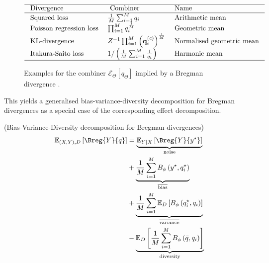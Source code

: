 \documentclass[../main.tex]{subfiles}
\begin{document}
\begin{figure}
$$
\begin{array}{lll}
\hline \text { Divergence } & \text { Combiner } & \text { Name } \\
\hline \text { Squared loss } & \frac{1}{M} \sum_{i=1}^M q_i & \text { Arithmetic mean } \\
\text { Poisson regression loss } & \prod_{i=1}^M q_i^{\frac{1}{M}} & \text { Geometric mean } \\
\text { KL-divergence } & Z^{-1} \prod_{i=1}^M\left(\mathbf{q}_i^{(c)}\right)^{\frac{1}{M}} & \text { Normalised geometric mean } \\
\text { Itakura-Saito loss } & 1 /\left(\frac{1}{M} \sum_{i=1}^M \frac{1}{q_i}\right) & \text { Harmonic mean } \\
\hline
\end{array}
$$
\caption{Examples for the combiner $\mathcal{E}_\Theta \left[q_\Theta\right]$ implied by a Bregman divergence \cite{wood_UnifiedTheoryDiversity_2023}.}
\end{figure}

This yields a generalised bias-variance-diversity decomposition for Bregman divergences as a special case of the corresponding effect decomposition.


\begin{theorem} (Bias-Variance-Diversity decomposition for Bregman divergences)
    \label{thm:bregman-diversity-decomp}
\begin{align*}
\mathbb{E}_{(X,Y), D}\left[ \Breg{Y}{q} \right]  
&= \underbrace{\mathbb{E}_{Y|X}\left[ \Breg{Y}{y^\star} \right]   }_{\text{noise}} \\
&+
\underbrace{
    \frac{1}{M} \sum_{i=1}^M B_\phi\left(y^\star, q_i^\star \right)
}_{\overline{\text{bias}}} \\
&+
\underbrace{
    \frac{1}{M} \sum_{i=1}^M \mathbb{E}_D\left[B_\phi\left(q_i^\star, q_i\right)\right]
}_{\overline{\text{variance}}} \\
&-
\underbrace{
    \mathbb{E}_D\left[\frac{1}{M} \sum_{i=1}^M B_\phi\left(\bar{q}, q_i\right)\right]
}_{\text{diversity}}
\end{align*}
\end{theorem}
\end{document}
